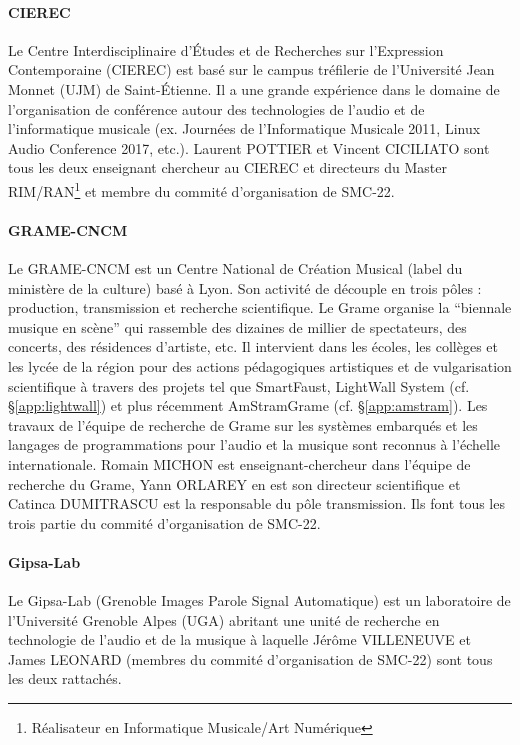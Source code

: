 \documentclass[fontsize=12pt]{scrartcl} %
\numberwithin{equation}{section} %
\numberwithin{table}{section} %
\begin{document}
\paragraph{\textbf{CIEREC}} Le Centre Interdisciplinaire d'Études et de Recherches sur l'Expression Contemporaine (CIEREC) est basé sur le campus tréfilerie de l'Université Jean Monnet (UJM) de Saint-Étienne. Il a une grande expérience dans le domaine de l'organisation de conférence autour des technologies de l'audio et de l'informatique musicale (ex. Journées de l'Informatique Musicale 2011, Linux Audio Conference 2017, etc.). Laurent POTTIER et Vincent CICILIATO sont tous les deux enseignant chercheur au CIEREC et directeurs du Master RIM/RAN\footnote{Réalisateur en Informatique Musicale/Art Numérique} et membre du commité d'organisation de SMC-22. 

\paragraph{\textbf{GRAME-CNCM}} Le GRAME-CNCM est un Centre National de Création Musical (label du ministère de la culture) basé à Lyon. Son activité de découple en trois pôles : production, transmission et recherche scientifique. Le Grame organise la ``biennale musique en scène'' qui rassemble des dizaines de millier de spectateurs, des concerts, des résidences d'artiste, etc. Il intervient dans les écoles, les collèges et les lycée de la région pour des actions pédagogiques artistiques et de vulgarisation scientifique à travers des projets tel que SmartFaust, LightWall System (cf. \S\ref{app:lightwall}) et plus récemment AmStramGrame (cf. \S\ref{app:amstram}). Les travaux de l'équipe de recherche de Grame sur les systèmes embarqués et les langages de programmations pour l'audio et la musique sont reconnus à l'échelle internationale. Romain MICHON est enseignant-chercheur dans l'équipe de recherche du Grame, Yann ORLAREY en est son directeur scientifique et Catinca DUMITRASCU est la responsable du pôle transmission. Ils font tous les trois partie du commité d'organisation de SMC-22.

\paragraph{\textbf{Gipsa-Lab}} Le Gipsa-Lab (Grenoble Images Parole Signal Automatique) est un laboratoire de l'Université Grenoble Alpes (UGA) abritant une unité de recherche en technologie de l'audio et de la musique à laquelle Jérôme VILLENEUVE et James LEONARD (membres du commité d'organisation de SMC-22) sont tous les deux rattachés.
\end{document}
